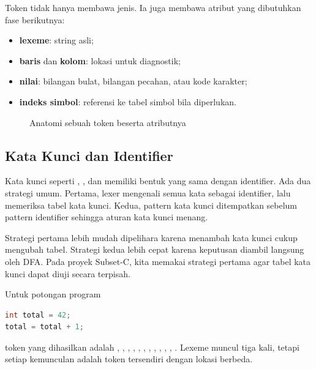 Token tidak hanya membawa jenis. Ia juga membawa atribut yang
dibutuhkan fase berikutnya:
\begin{itemize}[leftmargin=*]
  \item \textbf{lexeme}: string asli;
  \item \textbf{baris} dan \textbf{kolom}: lokasi untuk diagnostik;
  \item \textbf{nilai}: bilangan bulat, bilangan pecahan, atau kode
        karakter;
  \item \textbf{indeks simbol}: referensi ke tabel simbol bila
        diperlukan.
\end{itemize}

\begin{figure}[H]
\centering
{}
\caption{Anatomi sebuah token beserta atributnya}
\label{fig:ch05-anatomi}
\end{figure}

\subsection{Kata Kunci dan Identifier}

Kata kunci seperti , , dan 
memiliki bentuk yang sama dengan identifier. Ada dua strategi umum.
Pertama, lexer mengenali semua kata sebagai identifier, lalu memeriksa
tabel kata kunci. Kedua, pattern kata kunci ditempatkan sebelum
pattern identifier sehingga aturan kata kunci menang.

Strategi pertama lebih mudah dipelihara karena menambah kata kunci
cukup mengubah tabel. Strategi kedua lebih cepat karena keputusan
diambil langsung oleh DFA. Pada proyek Subset-C, kita memakai
strategi pertama agar tabel kata kunci dapat diuji secara terpisah.

\begin{contoh}
Untuk potongan program
\begin{lstlisting}[language=C]
int total = 42;
total = total + 1;
\end{lstlisting}
token yang dihasilkan adalah , ,
, , , ,
, , , ,
, . Lexeme  muncul tiga kali, tetapi
setiap kemunculan adalah token tersendiri dengan lokasi berbeda.
\end{contoh}
